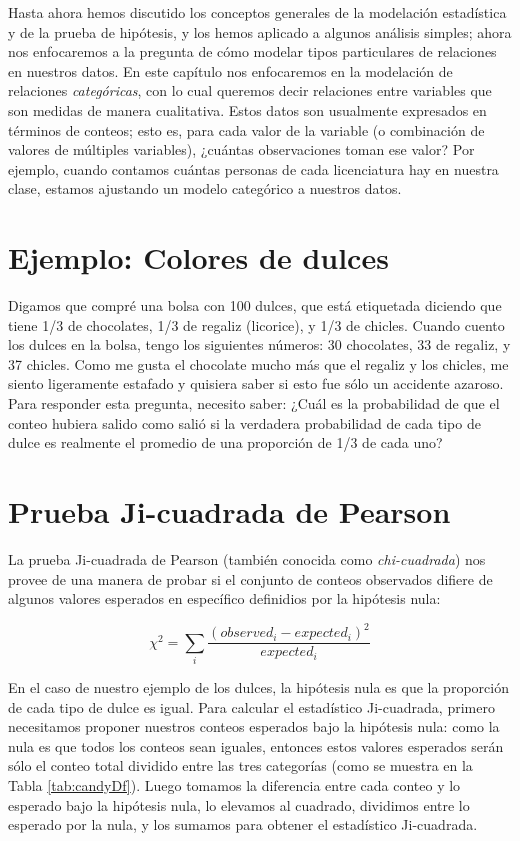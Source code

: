 \documentclass[
  12pt,
]{book}
\theoremstyle{definition}
\theoremstyle{definition}
\theoremstyle{definition}
\theoremstyle{remark}
\begin{document}
Hasta ahora hemos discutido los conceptos generales de la modelación estadística y de la prueba de hipótesis, y los hemos aplicado a algunos análisis simples; ahora nos enfocaremos a la pregunta de cómo modelar tipos particulares de relaciones en nuestros datos. En este capítulo nos enfocaremos en la modelación de relaciones \emph{categóricas}, con lo cual queremos decir relaciones entre variables que son medidas de manera cualitativa. Estos datos son usualmente expresados en términos de conteos; esto es, para cada valor de la variable (o combinación de valores de múltiples variables), ¿cuántas observaciones toman ese valor? Por ejemplo, cuando contamos cuántas personas de cada licenciatura hay en nuestra clase, estamos ajustando un modelo categórico a nuestros datos.

\hypertarget{ejemplo-colores-de-dulces}{%
\section{Ejemplo: Colores de dulces}\label{ejemplo-colores-de-dulces}}

Digamos que compré una bolsa con 100 dulces, que está etiquetada diciendo que tiene 1/3 de chocolates, 1/3 de regaliz (licorice), y 1/3 de chicles. Cuando cuento los dulces en la bolsa, tengo los siguientes números: 30 chocolates, 33 de regaliz, y 37 chicles. Como me gusta el chocolate mucho más que el regaliz y los chicles, me siento ligeramente estafado y quisiera saber si esto fue sólo un accidente azaroso. Para responder esta pregunta, necesito saber: ¿Cuál es la probabilidad de que el conteo hubiera salido como salió si la verdadera probabilidad de cada tipo de dulce es realmente el promedio de una proporción de 1/3 de cada uno?

\hypertarget{chi-squared-test}{%
\section{Prueba Ji-cuadrada de Pearson}\label{chi-squared-test}}

La prueba Ji-cuadrada de Pearson (también conocida como \emph{chi-cuadrada}) nos provee de una manera de probar si el conjunto de conteos observados difiere de algunos valores esperados en específico definidios por la hipótesis nula:

\[
\chi^2 = \sum_i\frac{(observed_i - expected_i)^2}{expected_i}
\]

En el caso de nuestro ejemplo de los dulces, la hipótesis nula es que la proporción de cada tipo de dulce es igual. Para calcular el estadístico Ji-cuadrada, primero necesitamos proponer nuestros conteos esperados bajo la hipótesis nula: como la nula es que todos los conteos sean iguales, entonces estos valores esperados serán sólo el conteo total dividido entre las tres categorías (como se muestra en la Tabla \ref{tab:candyDf}). Luego tomamos la diferencia entre cada conteo y lo esperado bajo la hipótesis nula, lo elevamos al cuadrado, dividimos entre lo esperado por la nula, y los sumamos para obtener el estadístico Ji-cuadrada.
\end{document}

